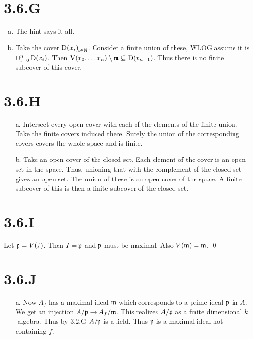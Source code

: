 \documentclass{article}
\begin{document}
\section{3.6.G}
\begin{enumerate}[a.]
    \item The hint says it all.
    \item Take the cover ${\operatorname{D}(x_i)}_{i \in \mathbb{N}}$. Consider a finite union of these, WLOG
          assume it is $\cup_{i=0}^n \operatorname{D}(x_i)$. Then $\operatorname{V}(x_0, \dots x_n) \setminus \mathfrak{m} \subseteq \operatorname{D}(x_{n+1})$. Thus there is
          no finite subcover of this cover.
\end{enumerate}

\section{3.6.H}
\begin{itemize}
    \item [a.] Intersect every open cover with each of the elements of the finite union.
          Take the finite covers induced there. Surely the union of the corresponding
          covers covers the whole space and is finite.
    \item [b.] Take an open cover of the closed set. Each element of the cover is an open
          set in the space. Thus, unioning that with the complement of the closed set
          gives an open set. The union of these is an open cover of the space. A finite
          subcover of this is then a finite subcover of the closed set.
\end{itemize}

\section{3.6.I}
Let ${\mathfrak{p}}=V(I)$. Then $I=\mathfrak{p}$ and
$\mathfrak{p}$ must be maximal. Also $V(\mathfrak{m})={\mathfrak{m}}$. \qed

\section{3.6.J}
\begin{itemize}
    \item [a.] Now $A_f$ has a maximal ideal $\mathfrak{m}$
          which corresponds to a prime ideal $\mathfrak{p}$ in
          $A$. We get an injection $A/\mathfrak{p} \to A_f/\mathfrak{m}$. This
          realizes $A/\mathfrak{p}$ as a finite dimensional
          $k$-algebra. Thus by 3.2.G $A/\mathfrak{p}$ is a
          field. Thus $\mathfrak{p}$ is a maximal ideal not containing
          $f$.
\end{itemize}
\end{document}
